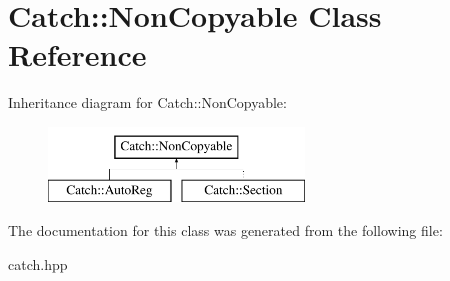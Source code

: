 \hypertarget{class_catch_1_1_non_copyable}{}\section{Catch\+:\+:Non\+Copyable Class Reference}
\label{class_catch_1_1_non_copyable}
Inheritance diagram for Catch\+:\+:Non\+Copyable\+:\begin{figure}[H]
\begin{center}
\leavevmode
\includegraphics[height=2.000000cm]{class_catch_1_1_non_copyable}
\end{center}
\end{figure}


The documentation for this class was generated from the following file\+:\begin{DoxyCompactItemize}
\item 
catch.\+hpp\end{DoxyCompactItemize}
